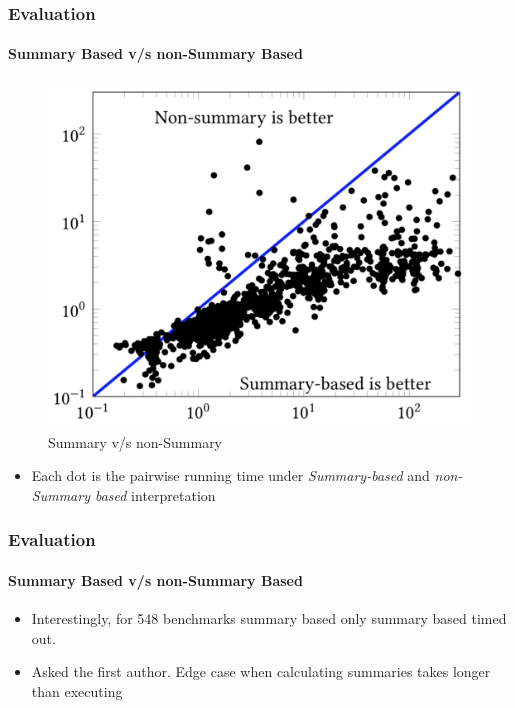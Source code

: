 \documentclass{beamer}
\begin{document}

\begin{frame}[fragile]
  \frametitle{Evaluation}
  \framesubtitle{Summary Based v/s non-Summary Based}
  \begin{figure}
    \centering
    \includegraphics[scale=0.25]{evaluationSummary}
    \caption{Summary v/s non-Summary}
  \end{figure}
  \begin{itemize}
    \item Each dot is the pairwise running time under
      \textit{Summary-based} and \textit{non-Summary based}
      interpretation
  \end{itemize}
\end{frame}
\begin{frame}[fragile]
  \frametitle{Evaluation}
  \framesubtitle{Summary Based v/s non-Summary Based}
  \begin{itemize}
    \item Interestingly, for 548 benchmarks summary based only
      summary based timed out.
    \item Asked the first author. Edge case when
      calculating summaries takes longer than executing
  \end{itemize}
\end{frame}
\end{document}

